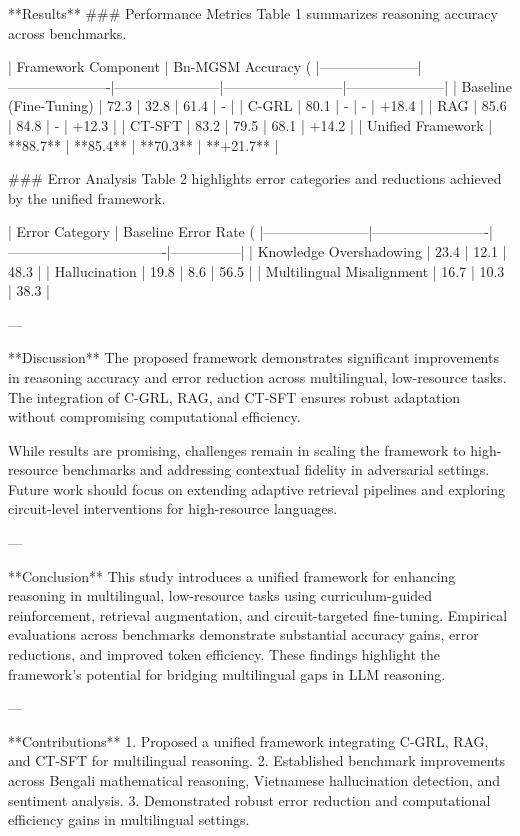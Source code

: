 **Results**  
### Performance Metrics  
Table 1 summarizes reasoning accuracy across benchmarks.

| Framework Component | Bn-MGSM Accuracy (%
|---------------------|----------------------|-----------------------|--------------------------|---------------------|
| Baseline (Fine-Tuning) | 72.3 | 32.8 | 61.4 | - |
| C-GRL                 | 80.1 | -     | -    | +18.4 |
| RAG                  | 85.6 | 84.8  | -    | +12.3 |
| CT-SFT               | 83.2 | 79.5  | 68.1 | +14.2 |
| Unified Framework    | **88.7** | **85.4** | **70.3** | **+21.7** |

### Error Analysis  
Table 2 highlights error categories and reductions achieved by the unified framework.

| Error Category        | Baseline Error Rate (%
|-----------------------|-------------------------|----------------------------------|---------------|
| Knowledge Overshadowing | 23.4 | 12.1 | 48.3 |
| Hallucination          | 19.8 | 8.6   | 56.5 |
| Multilingual Misalignment | 16.7 | 10.3  | 38.3 |

---

**Discussion**  
The proposed framework demonstrates significant improvements in reasoning accuracy and error reduction across multilingual, low-resource tasks. The integration of C-GRL, RAG, and CT-SFT ensures robust adaptation without compromising computational efficiency.

While results are promising, challenges remain in scaling the framework to high-resource benchmarks and addressing contextual fidelity in adversarial settings. Future work should focus on extending adaptive retrieval pipelines and exploring circuit-level interventions for high-resource languages.

---

**Conclusion**  
This study introduces a unified framework for enhancing reasoning in multilingual, low-resource tasks using curriculum-guided reinforcement, retrieval augmentation, and circuit-targeted fine-tuning. Empirical evaluations across benchmarks demonstrate substantial accuracy gains, error reductions, and improved token efficiency. These findings highlight the framework's potential for bridging multilingual gaps in LLM reasoning.

---

**Contributions**  
1. Proposed a unified framework integrating C-GRL, RAG, and CT-SFT for multilingual reasoning.
2. Established benchmark improvements across Bengali mathematical reasoning, Vietnamese hallucination detection, and sentiment analysis.
3. Demonstrated robust error reduction and computational efficiency gains in multilingual settings.